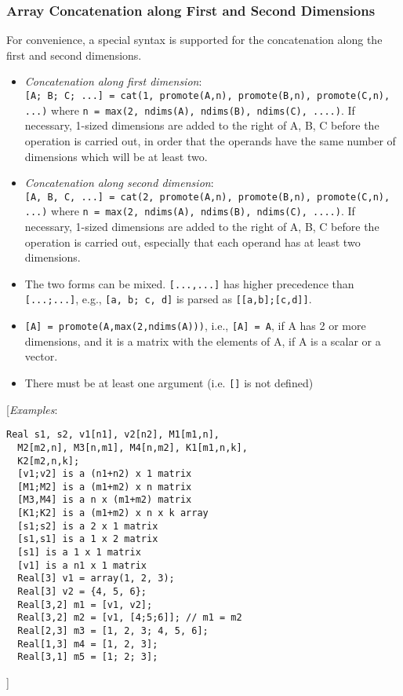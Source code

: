 \subsubsection{Array Concatenation along First and Second Dimensions}

For convenience, a special syntax is supported for the concatenation
along the first and second dimensions.

\begin{itemize}
\item
  \emph{Concatenation along first dimension}:\\
\lstinline![A; B; C; ...] = cat(1, promote(A,n), promote(B,n), promote(C,n),  ...)!
where \lstinline!n = max(2, ndims(A), ndims(B), ndims(C), ....)!. If necessary, 1-sized
  dimensions are added to the right of A, B, C before the operation is
  carried out, in order that the operands have the same number of
  dimensions which will be at least two.
\item
  \emph{Concatenation along second dimension}:\\
\lstinline![A, B, C, ...] = cat(2, promote(A,n), promote(B,n), promote(C,n), ...)! 
where \lstinline!n = max(2, ndims(A), ndims(B), ndims(C), ....)!. If necessary, 1-sized
  dimensions are added to the right of A, B, C before the operation is
  carried out, especially that each operand has at least two dimensions.
\item
  The two forms can be mixed. \lstinline![...,...]! has higher precedence than
 \lstinline![...;...]!, e.g., \lstinline![a, b; c, d]! is parsed as \lstinline![[a,b];[c,d]]!.
\item
\lstinline![A] = promote(A,max(2,ndims(A)))!, i.e., \lstinline![A] = A!, if A has 2 or
  more dimensions, and it is a matrix with the elements of A, if A is a
  scalar or a vector.
\item
  There must be at least one argument (i.e. \lstinline![]! is not defined)
\end{itemize}

{[}\emph{Examples}:

\begin{lstlisting}[language=modelica]
  Real s1, s2, v1[n1], v2[n2], M1[m1,n],
  M2[m2,n], M3[n,m1], M4[n,m2], K1[m1,n,k],
  K2[m2,n,k];
  [v1;v2] is a (n1+n2) x 1 matrix
  [M1;M2] is a (m1+m2) x n matrix
  [M3,M4] is a n x (m1+m2) matrix
  [K1;K2] is a (m1+m2) x n x k array
  [s1;s2] is a 2 x 1 matrix
  [s1,s1] is a 1 x 2 matrix
  [s1] is a 1 x 1 matrix
  [v1] is a n1 x 1 matrix
  Real[3] v1 = array(1, 2, 3);
  Real[3] v2 = {4, 5, 6};
  Real[3,2] m1 = [v1, v2];
  Real[3,2] m2 = [v1, [4;5;6]]; // m1 = m2
  Real[2,3] m3 = [1, 2, 3; 4, 5, 6];
  Real[1,3] m4 = [1, 2, 3];
  Real[3,1] m5 = [1; 2; 3];
\end{lstlisting}
{]}

